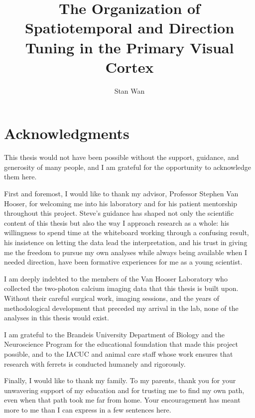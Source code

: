 \documentclass{brandeis-thesis3.3}
\title{The Organization of Spatiotemporal and Direction Tuning in the Primary Visual Cortex}
\author{Stan Wan}
\begin{document}
\maketitlepage

\chapter*{Acknowledgments}

\begin{doublespacing}

This thesis would not have been possible without the support,
guidance, and generosity of many people, and I am grateful for
the opportunity to acknowledge them here.

First and foremost, I would like to thank my advisor, Professor
Stephen Van Hooser, for welcoming me into his laboratory and
for his patient mentorship throughout this project. Steve's
guidance has shaped not only the scientific content of this
thesis but also the way I approach research as a whole: his
willingness to spend time at the whiteboard working through a
confusing result, his insistence on letting the data lead the
interpretation, and his trust in giving me the freedom to
pursue my own analyses while always being available when I
needed direction, have been formative experiences for me as
a young scientist. 

I am deeply indebted to the members of the Van Hooser
Laboratory who collected the two-photon calcium imaging data
that this thesis is built upon. Without their careful surgical
work, imaging sessions, and the years of methodological
development that preceded my arrival in the lab, none of the
analyses in this thesis would exist. 

I am grateful to the Brandeis University Department of Biology
and the Neuroscience Program for the educational foundation
that made this project possible, and to the IACUC and animal
care staff whose work ensures that research with ferrets is
conducted humanely and rigorously.

Finally, I would like to thank my family. To my parents, 
thank you for your unwavering support of
my education and for trusting me to find my own path, even
when that path took me far from home. Your encouragement has
meant more to me than I can express in a few sentences here.


\end{doublespacing}

\clearpage
\end{document}
